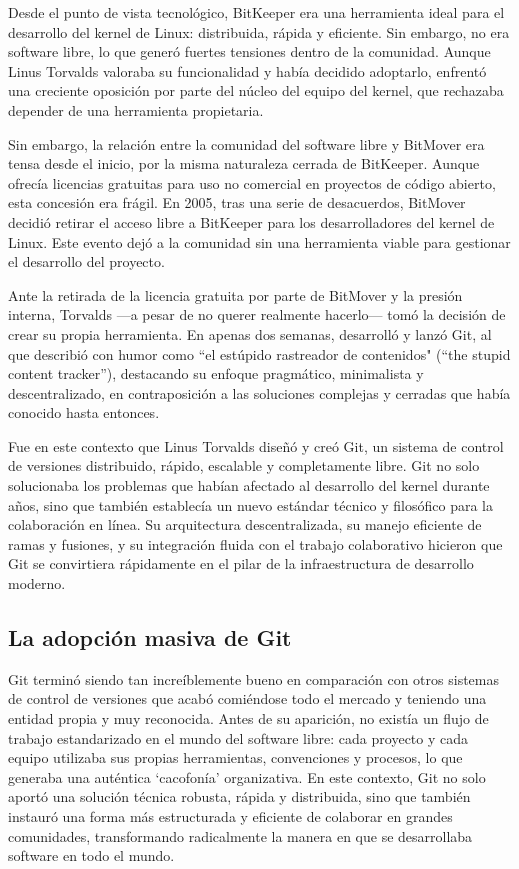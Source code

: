 \documentclass[a4paper,12pt]{article}
\begin{document}
Desde el punto de vista tecnológico, BitKeeper era una herramienta ideal para el
desarrollo del kernel de Linux: distribuida, rápida y eficiente. Sin embargo, no
era software libre, lo que generó fuertes tensiones dentro de la comunidad.
Aunque Linus Torvalds valoraba su funcionalidad y había decidido adoptarlo,
enfrentó una creciente oposición por parte del núcleo del equipo del kernel, que
rechazaba depender de una herramienta propietaria.

Sin embargo, la relación entre la comunidad del software libre y BitMover era
tensa desde el inicio, por la misma naturaleza cerrada de BitKeeper. Aunque
ofrecía licencias gratuitas para uso no comercial en proyectos de código
abierto, esta concesión era frágil. En 2005, tras una serie de desacuerdos,
BitMover decidió retirar el acceso libre a BitKeeper para los desarrolladores
del kernel de Linux. Este evento dejó a la comunidad sin una herramienta viable
para gestionar el desarrollo del proyecto.

Ante la retirada de la licencia gratuita por parte de BitMover y la presión
interna, Torvalds —a pesar de no querer realmente hacerlo— tomó la decisión de
crear su propia herramienta. En apenas dos semanas, desarrolló y lanzó Git, al
que describió con humor como ``el estúpido rastreador de contenidos" (“the stupid
content tracker”), destacando su enfoque pragmático, minimalista y
descentralizado, en contraposición a las soluciones complejas y cerradas que
había conocido hasta entonces.

Fue en este contexto que Linus Torvalds diseñó y creó Git, un sistema de control
de versiones distribuido, rápido, escalable y completamente libre. Git no solo
solucionaba los problemas que habían afectado al desarrollo del kernel durante
años, sino que también establecía un nuevo estándar técnico y filosófico para la
colaboración en línea. Su arquitectura descentralizada, su manejo eficiente de
ramas y fusiones, y su integración fluida con el trabajo colaborativo hicieron
que Git se convirtiera rápidamente en el pilar de la infraestructura de
desarrollo moderno.


\subsection{La adopción masiva de Git}

Git terminó siendo tan increíblemente bueno en comparación con otros sistemas de
control de versiones que acabó comiéndose todo el mercado y teniendo una entidad
propia y muy reconocida. Antes de su aparición, no existía un flujo de trabajo
estandarizado en el mundo del software libre: cada proyecto y cada equipo
utilizaba sus propias herramientas, convenciones y procesos, lo que generaba una
auténtica `cacofonía' organizativa. En este contexto, Git no solo aportó una
solución técnica robusta, rápida y distribuida, sino que también instauró una
forma más estructurada y eficiente de colaborar en grandes comunidades,
transformando radicalmente la manera en que se desarrollaba software en todo el
mundo.
\end{document}
